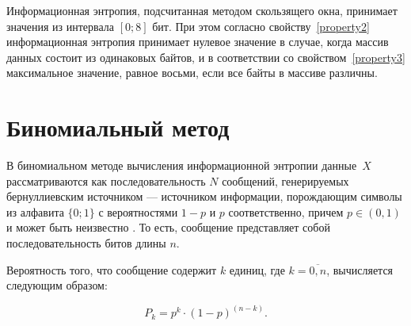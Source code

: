 Информационная энтропия, подсчитанная методом скользящего окна, принимает значения из интервала $[0;8]$ бит. При этом согласно свойству~\ref{property2} информационная энтропия принимает нулевое значение в случае, когда массив данных состоит из одинаковых байтов, и в соответствии со свойством~\ref{property3} максимальное значение, равное восьми, если все байты в массиве различны.


\section{Биномиальный метод}

В биномиальном методе вычисления информационной энтропии \cite{binomial-method} данные~$X$ рассматриваются как последовательность $N$ сообщений, генерируемых бернуллиевским источником --- источником информации, порождающим символы из алфавита $\{0; 1\}$ с вероятностями $1 - p$ и $p$ соответственно, причем $p \in (0, 1)$ и может быть неизвестно \cite{bernullie-source}. То есть, сообщение представляет собой последовательность битов длины $n$.

Вероятность того, что сообщение содержит $k$ единиц, где $k = \overline{0, n}$, вычисляется следующим образом:

\begin{equation}\label{pk}
	P_{k} = p^k \cdot (1 - p)^{(n - k)}.
\end{equation} 

